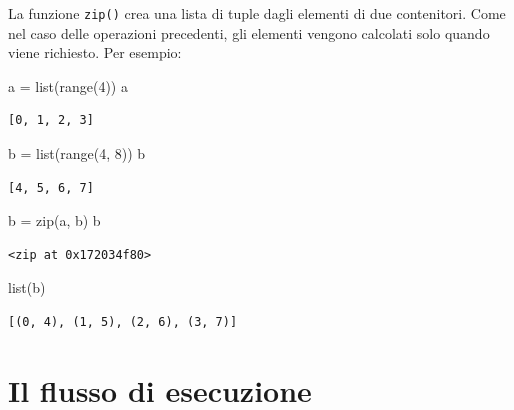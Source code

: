 \documentclass[
  letterpaper,
  krantz2]{{[}./krantz{]}}
\newenvironment{Shaded}{\begin{snugshade}}{\end{snugshade}}
\newcommand{\BuiltInTok}[1]{\textcolor[rgb]{0.00,0.23,0.31}{#1}}
\newcommand{\DecValTok}[1]{\textcolor[rgb]{0.68,0.00,0.00}{#1}}
\newcommand{\NormalTok}[1]{\textcolor[rgb]{0.00,0.23,0.31}{#1}}
\newcommand{\OperatorTok}[1]{\textcolor[rgb]{0.37,0.37,0.37}{#1}}
\begin{document}
La funzione \texttt{zip()} crea una lista di tuple dagli elementi di due
contenitori. Come nel caso delle operazioni precedenti, gli elementi
vengono calcolati solo quando viene richiesto. Per esempio:

\begin{Shaded}
\begin{Highlighting}[]
\NormalTok{a }\OperatorTok{=} \BuiltInTok{list}\NormalTok{(}\BuiltInTok{range}\NormalTok{(}\DecValTok{4}\NormalTok{))}
\NormalTok{a}
\end{Highlighting}
\end{Shaded}

\begin{verbatim}
[0, 1, 2, 3]
\end{verbatim}

\begin{Shaded}
\begin{Highlighting}[]
\NormalTok{b }\OperatorTok{=} \BuiltInTok{list}\NormalTok{(}\BuiltInTok{range}\NormalTok{(}\DecValTok{4}\NormalTok{, }\DecValTok{8}\NormalTok{))}
\NormalTok{b}
\end{Highlighting}
\end{Shaded}

\begin{verbatim}
[4, 5, 6, 7]
\end{verbatim}

\begin{Shaded}
\begin{Highlighting}[]
\NormalTok{b }\OperatorTok{=} \BuiltInTok{zip}\NormalTok{(a, b)}
\NormalTok{b}
\end{Highlighting}
\end{Shaded}

\begin{verbatim}
<zip at 0x172034f80>
\end{verbatim}

\begin{Shaded}
\begin{Highlighting}[]
\BuiltInTok{list}\NormalTok{(b)}
\end{Highlighting}
\end{Shaded}

\begin{verbatim}
[(0, 4), (1, 5), (2, 6), (3, 7)]
\end{verbatim}

\section{Il flusso di esecuzione}\label{il-flusso-di-esecuzione}
\end{document}
